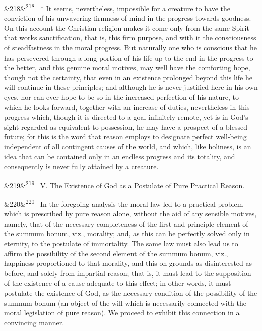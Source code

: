 \documentclass[12pt]{article}
\newcommand{\para}[1][]{\par\noindent\ifx&#1&\else\textsuperscript{\footnotesize #1}~\fi}
\begin{document}
\para[218] * It seems, nevertheless, impossible for a creature to have the conviction of his unwavering firmness of mind in the progress towards goodness. On this account the Christian religion makes it come only from the same Spirit that works sanctification, that is, this firm purpose, and with it the consciousness of steadfastness in the moral progress. But naturally one who is conscious that he has persevered through a long portion of his life up to the end in the progress to the better, and this genuine moral motives, may well have the comforting hope, though not the certainty, that even in an existence prolonged beyond this life he will continue in these principles; and although he is never justified here in his own eyes, nor can ever hope to be so in the increased perfection of his nature, to which he looks forward, together with an increase of duties, nevertheless in this progress which, though it is directed to a goal infinitely remote, yet is in God's sight regarded as equivalent to possession, he may have a prospect of a blessed future; for this is the word that reason employs to designate perfect well-being independent of all contingent causes of the world, and which, like holiness, is an idea that can be contained only in an endless progress and its totality, and consequently is never fully attained by a creature.

\para[219] V. The Existence of God as a Postulate of Pure Practical Reason.

\para[220] In the foregoing analysis the moral law led to a practical problem which is prescribed by pure reason alone, without the aid of any sensible motives, namely, that of the necessary completeness of the first and principle element of the summum bonum, viz., morality; and, as this can be perfectly solved only in eternity, to the postulate of immortality. The same law must also lead us to affirm the possibility of the second element of the summum bonum, viz., happiness proportioned to that morality, and this on grounds as disinterested as before, and solely from impartial reason; that is, it must lead to the supposition of the existence of a cause adequate to this effect; in other words, it must postulate the existence of God, as the necessary condition of the possibility of the summum bonum (an object of the will which is necessarily connected with the moral legislation of pure reason). We proceed to exhibit this connection in a convincing manner.
\end{document}
